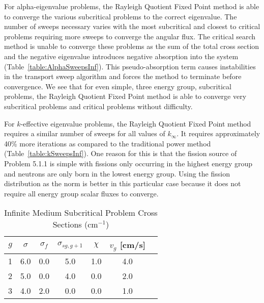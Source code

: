 For alpha-eigenvalue problems, the Rayleigh Quotient Fixed Point method is able to converge the various subcritical problems to the correct eigenvalue. The number of sweeps necessary varies with the most subcritical and closest to critical problems requiring more sweeps to converge the angular flux. The critical search method is unable to converge these problems as the sum of the total cross section and the negative eigenvalue introduces negative absorption into the system (Table~\ref{table:AlphaSweepsInf}). This pseudo-absorption term causes instabilities in the transport sweep algorithm and forces the method to terminate before convergence. We see that for even simple, three energy group, subcritical problems, the Rayleigh Quotient Fixed Point method is able to converge very subcritical problems and critical problems without difficulty.

For $k$-effective eigenvalue problems, the Rayleigh Quotient Fixed Point method requires a similar number of sweeps for all values of $k_{\infty}$. It requires approximately 40\% more iterations as compared to the traditional power method (Table~\ref{table:kSweepsInf}). One reason for this is that the fission source of Problem 5.1.1 is simple with fissions only occurring in the highest energy group and neutrons are only born in the lowest energy group. Using the fission distribution as the norm is better in this particular case because it does not require all energy group scalar fluxes to converge.

\begin{table}[!htbp]
    \centering
    \caption{Infinite Medium Subcritical Problem Cross Sections (cm$^{-1}$)}
\label{table:Betzler3}
    \begin{tabular}{*7c}
        \toprule
	$g$ & $\sigma$ & $\sigma_{f}$ & $\sigma_{sg,g+1}$ & $\chi$ & $v_{g}$ [cm/s] \\ 
        \midrule
	1 & 6.0 & 0.0 & 5.0 & 1.0 & 4.0 \\
	2 & 5.0 & 0.0 & 4.0 & 0.0 & 2.0 \\
	3 & 4.0 & 2.0 & 0.0 & 0.0 & 1.0 \\
        \bottomrule
    \end{tabular}
\end{table}

